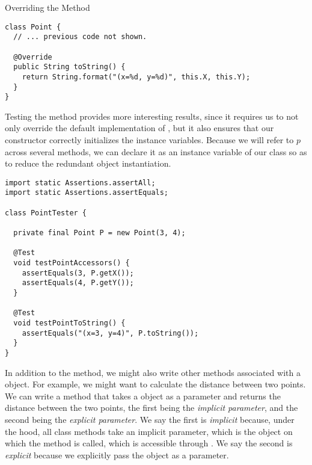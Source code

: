 \begin{cl}[]{Overriding the  Method}
\begin{lstlisting}[language=MyJava]
class Point {
  // ... previous code not shown.

  @Override
  public String toString() {
    return String.format("(x=%d, y=%d)", this.X, this.Y);
  }
}
\end{lstlisting}
\end{cl}

Testing the  method provides more interesting results, since it requires us to not only override the default implementation of , but it also ensures that our constructor correctly initializes the instance variables. Because we will refer to $p$ across several methods, we can declare it as an instance variable of our  class so as to reduce the redundant object instantiation.

\begin{cl}[]{}
\begin{lstlisting}[language=MyJava]
import static Assertions.assertAll;
import static Assertions.assertEquals;

class PointTester {

  private final Point P = new Point(3, 4);

  @Test
  void testPointAccessors() {
    assertEquals(3, P.getX());
    assertEquals(4, P.getY());
  }

  @Test
  void testPointToString() {
    assertEquals("(x=3, y=4)", P.toString());
  }
}
\end{lstlisting}
\end{cl}

In addition to the  method, we might also write other methods associated with a  object. For example, we might want to calculate the distance between two points. We can write a  method that takes a  object as a parameter and returns the distance between the two points, the first being the \textit{implicit parameter}, and the second being the \textit{explicit parameter}. We say the first is \textit{implicit} because, under the hood, all class methods take an implicit parameter, which is the object on which the method is called, which is accessible through . We say the second is \textit{explicit} because we explicitly pass the object as a parameter. 

